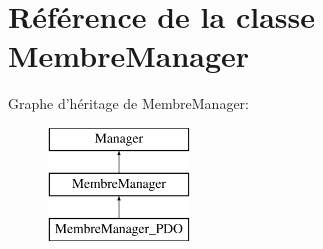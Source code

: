\hypertarget{class_library_1_1_models_1_1_membre_manager}{\section{Référence de la classe Membre\+Manager}
\label{class_library_1_1_models_1_1_membre_manager}
}
Graphe d'héritage de Membre\+Manager\+:\begin{figure}[H]
\begin{center}
\leavevmode
\includegraphics[height=3.000000cm]{class_library_1_1_models_1_1_membre_manager}
\end{center}
\end{figure}
